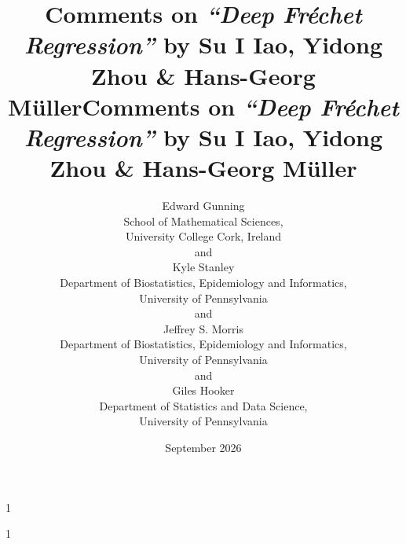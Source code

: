 \documentclass[12pt]{article}
\newcommand{\Frechet}{Fr\'echet\xspace}
\newcommand{\anon}{1}
\begin{document}
\def\spacingset#1{\renewcommand{\baselinestretch}{#1}\small\normalsize}
\spacingset{1}

\anon
{
  \title{\bf Comments on \emph{``Deep \Frechet Regression''} by Su I Iao, Yidong Zhou \& Hans-Georg Müller}
  \author{
    Edward Gunning\hspace{.2cm}\\
    School of Mathematical Sciences,\\ University College Cork, Ireland\\
    and\\
    Kyle Stanley\\
    Department of Biostatistics, Epidemiology and Informatics, \\University of Pennsylvania\\
    and\\
    Jeffrey S. Morris\\
    Department of Biostatistics, Epidemiology and Informatics,\\ University of Pennsylvania\\
    and\\
    Giles Hooker\\
    Department of Statistics and Data Science,\\ University of Pennsylvania}
  \date{September 2026}
  \maketitle
} \fi

\anon
{
  \bigskip
  \bigskip
  \bigskip
  \begin{center}
    \title{\bf Comments on \emph{``Deep \Frechet Regression''} by Su I Iao, Yidong Zhou \& Hans-Georg Müller}
  \end{center}
  \medskip
} \fi

\bigskip


\vfill

\newpage
\spacingset{1.8}








\vspace{-1em}

\end{document}
